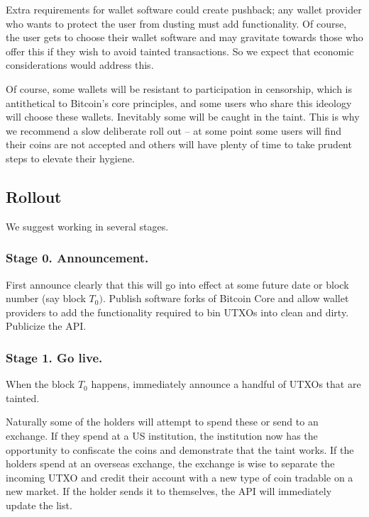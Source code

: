 \documentclass{article}%
\begin{document}
Extra requirements for wallet software could create pushback; any wallet provider who wants to protect the user from dusting must add functionality.
 Of course, the user gets to choose their wallet software and may gravitate
towards those who offer this if they wish to avoid tainted transactions.  So
we expect that economic considerations would address this.

Of course, some wallets will be resistant to participation in censorship,
which is antithetical to Bitcoin's core principles, and some users who share
this ideology will choose these wallets.  Inevitably some will be caught in
the taint.  This is why we recommend a slow deliberate roll out -- at some
point some users will find their coins are not accepted and others will have
plenty of time to take prudent steps to elevate their hygiene.

\subsection{Rollout}

We suggest working in several stages.

\subsubsection{Stage 0. Announcement.}

 First announce clearly that this will go into effect at some future date
or block number (say block $T_{0}).$  Publish software forks of Bitcoin Core
and allow wallet providers to add the functionality required to bin UTXOs into
clean and dirty.  Publicize the API.

\subsubsection{Stage 1. Go live.}

When the block $T_{0}$ happens, immediately announce a handful of UTXOs that
are tainted.

Naturally some of the holders will attempt to spend these or send to an
exchange.  If they spend at a US institution, the institution now has the
opportunity to confiscate the coins and demonstrate that the taint works.  If
the holders spend at an overseas exchange, the exchange is wise to separate
the incoming UTXO and credit their account with a new type of coin tradable on
a new market. If the holder sends it to themselves, the API will immediately update the
list.
\end{document}
